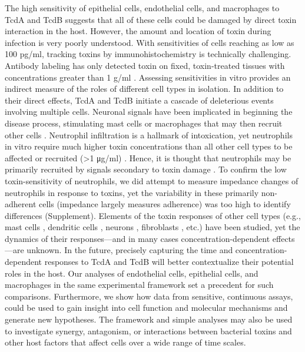 The high sensitivity of epithelial cells, endothelial cells, 
and macrophages to TcdA and TcdB suggests that all of 
these cells could be damaged by direct toxin interaction 
in the host. However, the amount and location of toxin 
during infection is very poorly understood. With 
sensitivities of cells reaching as low as 100 pg/ml, 
tracking toxins by immunohistochemistry is technically 
challenging. Antibody labeling has only detected toxin 
on fixed, toxin-treated tissues with concentrations 
greater than 1 \textmugreek{}g/ml \cite{Keel:2007jh}. Assessing sensitivities 
in vitro provides an indirect measure of the roles of 
different cell types in isolation. In addition to their 
direct effects, TcdA and TcdB initiate a cascade of 
deleterious events involving multiple cells. Neuronal 
signals have been implicated in beginning the disease 
process, stimulating mast cells or macrophages that may then 
recruit other cells 
\cite{Sorensson:2001da,Pothoulakis:1998vca,Castagliuolo:1998fu,Castagliuolo:1994ta}. 
Neutrophil infiltration is a 
hallmark of intoxication, yet neutrophils in vitro require 
much higher toxin concentrations than all other cell types 
to be affected or recruited (>1 μg/ml) 
\cite{Kelly:1994cu,Brito:2002kq,Shah:1991ww,Pothoulakis:1988dk,Dailey:1987vo}. 
Hence, it is thought that neutrophils may be primarily 
recruited by signals secondary to toxin damage \cite{Kelly:1994cu,Sun:2010kt,Voth:2005di}. 
To confirm the low toxin-sensitivity of neutrophils, we 
did attempt to measure impedance changes of neutrophils 
in response to toxins, yet the variability in these 
primarily non-adherent cells (impedance largely measures adherence) 
was too high to identify differences (Supplement). 
Elements of the toxin responses of other cell types 
(e.g., mast cells \cite{Meyer:2007kj,Calderon:1998tr,Gerhard:2011hm}, 
dendritic cells \cite{Lee:2008jf,Jafari:2013ji}, 
neurons \cite{Xia:2000gg,Neunlist:2003ba}, 
fibroblasts \cite{Wedel:1983vd,ChavesOlarte:1996jy}, etc.) have been 
studied, yet the dynamics of their responses—and in many 
cases concentration-dependent effects—are unknown. In the 
future, precisely capturing the time and concentration-dependent 
responses to TcdA and TcdB will better contextualize their 
potential roles in the host. Our analyses of endothelial 
cells, epithelial cells, and macrophages in the same 
experimental framework set a precedent for such comparisons. 
Furthermore, we show how data from sensitive, continuous 
assays, could be used to gain insight into cell function 
and molecular mechanisms and generate new hypotheses. The 
framework and simple analyses may also be used to investigate 
synergy, antagonism, or interactions between bacterial toxins 
and other host factors that affect cells over a wide range of 
time scales.

